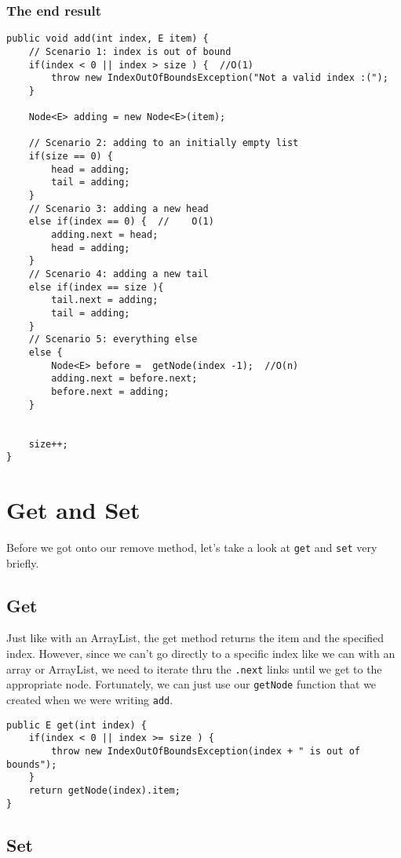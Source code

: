 \subsubsection{The end result}
\begin{verbatim}
public void add(int index, E item) {
	// Scenario 1: index is out of bound
	if(index < 0 || index > size ) {  //O(1)
		throw new IndexOutOfBoundsException("Not a valid index :(");
	}
	
	Node<E> adding = new Node<E>(item);
	
	// Scenario 2: adding to an initially empty list
	if(size == 0) {
		head = adding;
		tail = adding;
	}
	// Scenario 3: adding a new head
	else if(index == 0) {  //    O(1)
		adding.next = head;
		head = adding;
	}
	// Scenario 4: adding a new tail
	else if(index == size ){
		tail.next = adding;
		tail = adding;
	}
	// Scenario 5: everything else
	else {
		Node<E> before =  getNode(index -1);  //O(n)
		adding.next = before.next;
		before.next = adding;
	}
	
	
	size++;
}
\end{verbatim}



\section{Get and Set}
Before we got onto our remove method, let's take a look at \texttt{get} and \texttt{set} very briefly.

\subsection{Get}
Just like with an ArrayList, the get method returns the item and the specified index.  
However, since we can't go directly to a specific index like we can with an array or ArrayList, we need to iterate thru the \texttt{.next} links until we get to the appropriate node.
Fortunately, we can just use our \texttt{getNode} function that we created when we were writing \texttt{add}.



\begin{verbatim}
public E get(int index) {
	if(index < 0 || index >= size ) { 
		throw new IndexOutOfBoundsException(index + " is out of bounds");
	}
	return getNode(index).item;
}
\end{verbatim}


\subsection{Set}

